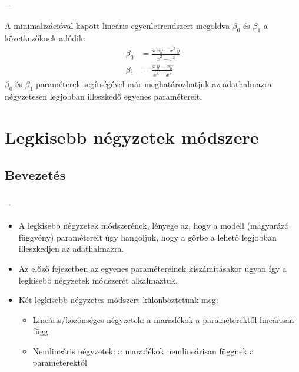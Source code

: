 \documentclass [aspectratio=169]{beamer}
\newcommand{\titten}{\secname{} -- \subsecname}
\begin{document}
\begin{frame}
\frametitle{\titten}
A minimalizációval kapott lineáris egyenletrendszert megoldva $\beta_0$ és $\beta_1$ a következőknek adódik:
\begin{align*}
\beta_0&=\frac{\overline{x}\:\overline{xy}-\overline{x^2}\:\overline{y}}{\overline{x}^2-\overline{x^2}}\\
\beta_1&=\frac{\overline{x}\:\overline{y}-\overline{xy}}{\overline{x}^2-\overline{x^2}}
\end{align*}
$\beta_0$ és $\beta_1$ paraméterek segítségével már meghatározhatjuk az adathalmazra négyzetesen legjobban illeszkedő egyenes paramétereit.
\end{frame}
\section{Legkisebb négyzetek módszere}
\subsection{Bevezetés}
\begin{frame}
\frametitle{\titten}
\begin{itemize}
\item A legkisebb négyzetek módszerének, lényege az, hogy a modell (magyarázó függvény) paramétereit úgy hangoljuk, hogy a görbe a lehető legjobban illeszkedjen az adathalmazra.
\item Az előző fejezetben az egyenes paramétereinek kiszámításakor ugyan így a legkisebb négyzetek módszerét alkalmaztuk.
\item Két legkisebb négyzetes módszert különböztetünk meg:
\begin{itemize}
\item Lineáris/közönséges négyzetek: a maradékok a paraméterektől lineárisan függ
\item Nemlineáris négyzetek: a maradékok nemlineárisan függnek a paraméterektől
\end{itemize}
\end{itemize}
\end{frame}
\end{document}

